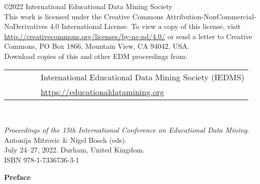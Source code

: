 \documentclass[letterpaper,11pt,oneside]{book} %
\begin{document}
\clearpage

\thispagestyle{empty}


\large
\noindent
\copyright 2022 International Educational Data Mining Society\\

This work is licensed under the Creative Commons Attribution-NonCommercial-NoDerivatives 4.0 International License. To view a copy of this license, visit \url{http://creativecommons.org/licenses/by-nc-nd/4.0/} or send a letter to Creative Commons, PO Box 1866, Mountain View, CA 94042, USA.\\

Download copies of this and other EDM proceedings from:

\begin{tabular}{ll}
\ \ \ \ \ \ & International Educational Data Mining Society (IEDMS)\\
&{\url{https://educationaldatamining.org}}\\
\end{tabular}\\

\vspace*{\fill}


\textit{Proceedings of the 15th International Conference on Educational Data Mining}.\\ Antonija Mitrovic \& Nigel Bosch (eds).\\ July 24--27, 2022. 
    Durham, United Kingdom.\\
\noindent ISBN 978-1-7336736-3-1\\

\clearpage


{} 


\begin{center}
  {\Large \bf Preface}
\end{center}
\end{document}
